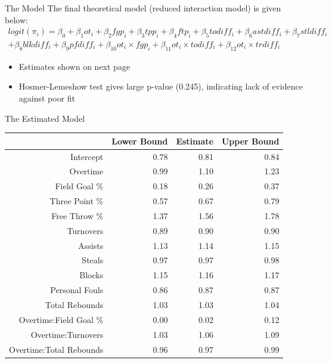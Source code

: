 \documentclass{beamer}
\begin{document}
	\begin{frame}{The Model}
	The final theoretical model (reduced interaction model) is given below: 
	\begin{multline} \label{eq:finalmodel}
	logit(\pi_{i})=\beta_{0}+\beta_{1}ot_{i}+\beta_{2}fgp_{i}+\beta_{3}tpp_{i}+\beta_{4}ftp_{i}+\beta_{5}todiff_{i}+\beta_{6}astdiff_{i}+\beta_{7}stldiff_{i}\\
	+\beta_{8}blkdiff_{i}+\beta_{9}pfdiff_{i}+\beta_{10}ot_{i}\times fgp_{i}+\beta_{11}ot_{i}\times todiff_{i} +\beta_{12}ot_{i}\times trdiff_{i}
	\end{multline}
\begin{itemize}
	\item Estimates shown on next page
	\item Hosmer-Lemeshow test gives large p-value (0.245), indicating lack of evidence against poor fit
\end{itemize}	
\end{frame}	

\begin{frame}{The Estimated Model}
\begin{table}[ht]
	\centering
	\begin{tabular}{rrrr}
		\hline
		& Lower Bound & Estimate & Upper Bound \\ 
		\hline
		Intercept & 0.78 & 0.81 & 0.84 \\ 
		Overtime & 0.99 & 1.10 & 1.23 \\ 
		Field Goal \% & 0.18 & 0.26 & 0.37 \\ 
		Three Point \% & 0.57 & 0.67 & 0.79 \\ 
		Free Throw \% & 1.37 & 1.56 & 1.78 \\ 
		Turnovers & 0.89 & 0.90 & 0.90 \\ 
		Assists & 1.13 & 1.14 & 1.15 \\ 
		Steals & 0.97 & 0.97 & 0.98 \\ 
		Blocks & 1.15 & 1.16 & 1.17 \\ 
		Personal Fouls & 0.86 & 0.87 & 0.87 \\ 
		Total Rebounds & 1.03 & 1.03 & 1.04 \\ 
		Overtime:Field Goal \% & 0.00 & 0.02 & 0.12 \\ 
		Overtime:Turnovers & 1.03 & 1.06 & 1.09 \\ 
		Overtime:Total Rebounds & 0.96 & 0.97 & 0.99 \\ 
		\hline
	\end{tabular}
\end{table}
\end{frame}	
\end{document}
